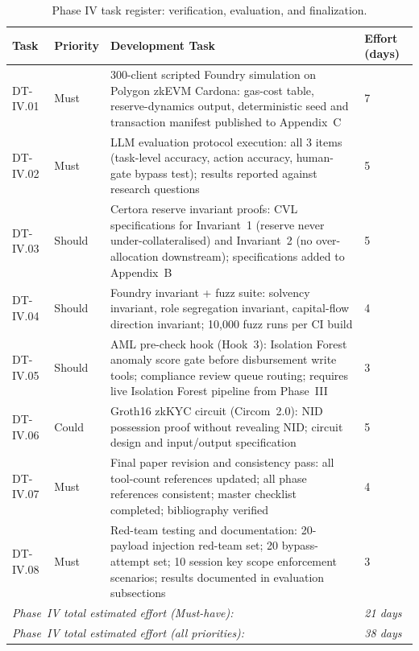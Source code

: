 \documentclass[12pt,a4paper]{report}
\begin{document}
\begin{table}[H]
\centering
\caption{Phase IV task register: verification, evaluation, and finalization.}
\label{tab:phaseIV}
\small
\begin{tabular}{p{1.8cm}p{1.8cm}p{7.5cm}p{1.5cm}}
\hline
\textbf{Task} & \textbf{Priority} & \textbf{Development Task} & \textbf{Effort (days)} \\
\hline
DT-IV.01 & Must & 300-client scripted Foundry simulation on Polygon zkEVM Cardona: gas-cost table, reserve-dynamics output, deterministic seed and transaction manifest published to Appendix~C & 7 \\
\hline
DT-IV.02 & Must & LLM evaluation protocol execution: all 3 items (task-level accuracy, action accuracy, human-gate bypass test); results reported against research questions & 5 \\
\hline
DT-IV.03 & Should & Certora reserve invariant proofs: CVL specifications for Invariant~1 (reserve never under-collateralised) and Invariant~2 (no over-allocation downstream); specifications added to Appendix~B & 5 \\
\hline
DT-IV.04 & Should & Foundry invariant + fuzz suite: solvency invariant, role segregation invariant, capital-flow direction invariant; 10{,}000 fuzz runs per CI build & 4 \\
\hline
DT-IV.05 & Should & AML pre-check hook (Hook~3): Isolation Forest anomaly score gate before disbursement write tools; compliance review queue routing; requires live Isolation Forest pipeline from Phase~III & 3 \\
\hline
DT-IV.06 & Could & Groth16 zkKYC circuit (Circom~2.0): NID possession proof without revealing NID; circuit design and input/output specification & 5 \\
\hline
DT-IV.07 & Must & Final paper revision and consistency pass: all tool-count references updated; all phase references consistent; master checklist completed; bibliography verified & 4 \\
\hline
DT-IV.08 & Must & Red-team testing and documentation: 20-payload injection red-team set; 20 bypass-attempt set; 10 session key scope enforcement scenarios; results documented in evaluation subsections & 3 \\
\hline
\multicolumn{3}{l}{\textit{Phase~IV total estimated effort (Must-have):}} & \textit{21 days} \\
\multicolumn{3}{l}{\textit{Phase~IV total estimated effort (all priorities):}} & \textit{38 days} \\
\hline
\end{tabular}
\end{table}
\end{document}
